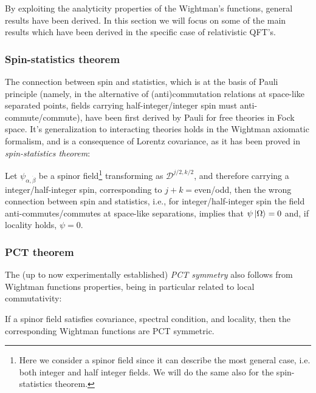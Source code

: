 \documentclass[../main/main.tex]{subfiles}
\begin{document}
By exploiting the analyticity properties of the Wightman's functions, general results have been derived.  In this section we will focus on some of the main results which have been derived in the specific case of relativistic QFT's.

\subsubsection{Spin-statistics theorem}

The connection between spin and statistics, which is at the basis of Pauli principle (namely, in the alternative of (anti)commutation relations at space-like separated points, fields carrying half-integer/integer spin must anti-commute/commute), have been first derived by Pauli for free theories in Fock space. It's generalization to interacting theories holds in the Wightman axiomatic formalism, and is a consequence of Lorentz covariance, as it has been proved in \emph{spin-statistics theorem}:
\begin{theorem}
	Let $\psi_{\alpha,\dot\beta}$ be a spinor field\footnote{Here we consider a spinor field since it can describe the most general case, i.e. both integer and half integer fields. We will do the same also for the spin-statistics theorem.} transforming as $\mathcal D^{j/2,k/2}$, and therefore carrying a integer/half-integer spin, corresponding to $j+k=$even/odd, then the wrong connection between spin and statistics, i.e., for integer/half-integer spin the field anti-commutes/commutes at space-like separations, implies that $\psi\,\vert\Omega\rangle=0$ and, if locality holds, $\psi=0$.
\end{theorem}

\subsubsection{PCT theorem}

The (up to now experimentally established) \emph{PCT symmetry} also follows from Wightman functions properties, being in particular related to local commutativity:
\begin{theorem}
	If a spinor field satisfies covariance, spectral condition, and locality, then the corresponding Wightman functions are PCT symmetric.
\end{theorem}
\end{document}
